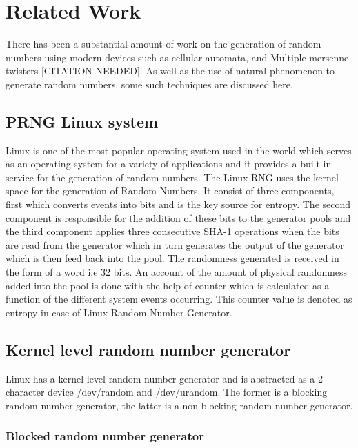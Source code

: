 \documentclass{IEEEtran}
\begin{document}
\section{Related Work}

There has been a substantial amount of work on the generation of random numbers using modern devices such as cellular automata, and Multiple-mersenne twisters [CITATION NEEDED]. As well as the use of natural phenomenon to generate random numbers, some such techniques are discussed here. \cite{Mul13} 

\subsection{PRNG Linux system}

Linux is one of the most popular operating system used in the world which serves as an operating system for a variety of applications and it provides a built in service for the generation of random numbers. The  Linux RNG uses the kernel space for the generation of Random Numbers. It  consist of three components, first which converts events into bits and is the  key source for entropy. The second component is responsible for the addition of these bits to the generator pools and the third component applies three consecutive  SHA-1 operations when the bits are read from the generator which in turn generates the output of the generator which is then feed back into the pool. The randomness generated is received in the form of a word i.e 32 bits. An account  of the amount of physical randomness added into the pool is done with the help of counter which is calculated as a function of the different system events occurring. This counter value is denoted as entropy in case of Linux Random Number Generator.

 
\subsection{Kernel level random number generator}

Linux has a kernel-level random number generator and is abstracted as a 2-character device /dev/random and /dev/urandom. The former is a blocking random number generator, the latter is a non-blocking random number generator. \cite{Vui12, Gut06, Vie03}

\subsubsection{Blocked random number generator}
\end{document}
